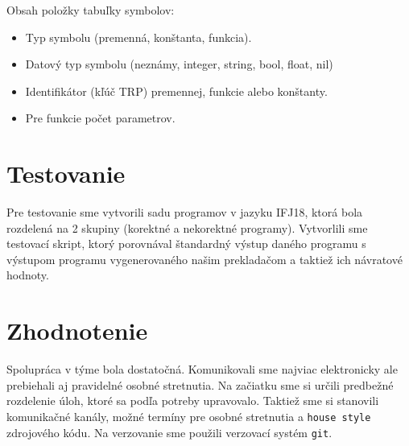 \documentclass[a4paper, 11pt]{article}
\begin{document}
Obsah položky tabuľky symbolov:
\begin{itemize}
	\item Typ symbolu (premenná, konštanta, funkcia).
	\item Datový typ symbolu (neznámy, integer, string, bool, float, nil)
	\item Identifikátor (kľúč TRP) premennej, funkcie alebo konštanty.
	\item Pre funkcie počet parametrov.
\end{itemize}
\section{Testovanie}
Pre testovanie sme vytvorili sadu programov v jazyku IFJ18, ktorá bola rozdelená na 2 skupiny (korektné a nekorektné programy). Vytvorlili sme testovací skript, ktorý porovnával štandardný výstup daného programu s výstupom programu vygenerovaného našim prekladačom a taktiež ich návratové hodnoty. 
\section{Zhodnotenie}
Spolupráca v týme bola dostatočná. Komunikovali sme najviac elektronicky ale prebiehali aj pravidelné osobné stretnutia. Na začiatku sme si určili predbežné rozdelenie úloh, ktoré sa podľa potreby upravovalo. Taktiež sme si stanovili komunikačné kanály, možné termíny pre osobné stretnutia a \texttt{house style} zdrojového kódu. Na verzovanie sme použili verzovací systém \texttt{git}.
\end{document}
